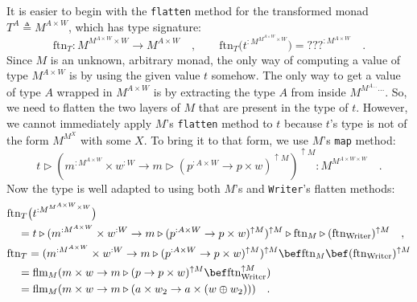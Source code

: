 It is easier to begin with the \lstinline!flatten! method for the
transformed monad $T^{A}\triangleq M^{A\times W}$, which has type
signature:
\[
\text{ftn}_{T}:M^{M^{A\times W}\times W}\rightarrow M^{A\times W}\quad,\quad\quad\text{ftn}_{T}\big(t^{:M^{M^{A\times W}\times W}}\big)=\text{???}^{:M^{A\times W}}\quad.
\]
Since $M$ is an unknown, arbitrary monad, the only way of computing
a value of type $M^{A\times W}$ is by using the given value $t$
somehow. The only way to get a value of type $A$ wrapped in $M^{A\times W}$
is by extracting the type $A$ from inside $M^{M^{A...}...}$. So,
we need to flatten the two layers of $M$ that are present in the
type of $t$. However, we cannot immediately apply $M$\textsf{'}s \lstinline!flatten!
method to $t$ because $t$\textsf{'}s type is not of the form $M^{M^{X}}$
with some $X$. To bring it to that form, we use $M$\textsf{'}s \lstinline!map!
method:
\[
t\triangleright(m^{:M^{A\times W}}\times w^{:W}\rightarrow m\triangleright(p^{:A\times W}\rightarrow p\times w)^{\uparrow M})^{\uparrow M}:M^{M^{A\times W\times W}}\quad.
\]
Now the type is well adapted to using both $M$\textsf{'}s and \lstinline!Writer!\textsf{'}s
flatten methods:
\begin{align*}
 & \text{ftn}_{T}\big(t^{:M^{M^{A\times W}\times W}}\big)\\
 & \quad=t\triangleright(m^{:M^{A\times W}}\times w^{:W}\rightarrow m\triangleright(p^{:A\times W}\rightarrow p\times w)^{\uparrow M})^{\uparrow M}\triangleright\text{ftn}_{M}\triangleright(\text{ftn}_{\text{Writer}})^{\uparrow M}\quad,\\
 & \text{ftn}_{T}=(m^{:M^{A\times W}}\times w^{:W}\rightarrow m\triangleright(p^{:A\times W}\rightarrow p\times w)^{\uparrow M})^{\uparrow M}\bef\text{ftn}_{M}\bef(\text{ftn}_{\text{Writer}})^{\uparrow M}\\
 & \quad=\text{flm}_{M}(m\times w\rightarrow m\triangleright(p\rightarrow p\times w)^{\uparrow M}\bef\text{ftn}_{\text{Writer}}^{\uparrow M})\\
 & \quad=\text{flm}_{M}(m\times w\rightarrow m\triangleright(a\times w_{2}\rightarrow a\times(w\oplus w_{2})))\quad.
\end{align*}

